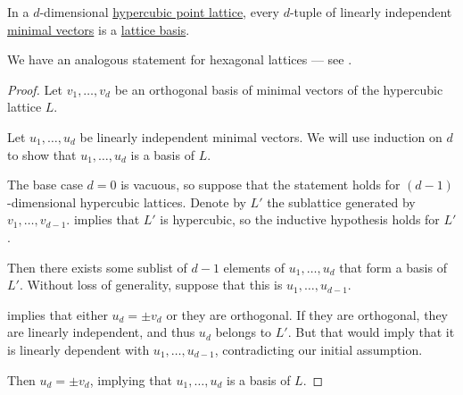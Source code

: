 \begin{corollary}\label{thm:hypercubic_point_lattice_minimal_basis}
  In a \( d \)-dimensional \hyperref[def:hypercubic_point_lattice]{hypercubic point lattice}, every \( d \)-tuple of linearly independent \hyperref[def:minimal_lattice_vector]{minimal vectors} is a \hyperref[def:point_lattice_basis]{lattice basis}.
\end{corollary}
\begin{comments}
  \item We have an analogous statement for hexagonal lattices --- see .
\end{comments}
\begin{proof}
  Let \( v_1, \ldots, v_d \) be an orthogonal basis of minimal vectors of the hypercubic lattice \( L \).

  Let \( u_1, \ldots, u_d \) be linearly independent minimal vectors. We will use induction on \( d \) to show that \( u_1, \ldots, u_d \) is a basis of \( L \).

  The base case \( d = 0 \) is vacuous, so suppose that the statement holds for \( (d - 1) \)-dimensional hypercubic lattices. Denote by \( L' \) the sublattice generated by \( v_1, \ldots, v_{d-1} \).  implies that \( L' \) is hypercubic, so the inductive hypothesis holds for \( L' \).

  Then there exists some sublist of \( d - 1 \) elements of \( u_1, \ldots, u_d \) that form a basis of \( L' \). Without loss of generality, suppose that this is \( u_1, \ldots, u_{d-1} \).

   implies that either \( u_d = \pm v_d \) or they are orthogonal. If they are orthogonal, they are linearly independent, and thus \( u_d \) belongs to \( L' \). But that would imply that it is linearly dependent with \( u_1, \ldots, u_{d-1} \), contradicting our initial assumption.

  Then \( u_d = \pm v_d \), implying that \( u_1, \ldots, u_d \) is a basis of \( L \).
\end{proof}


